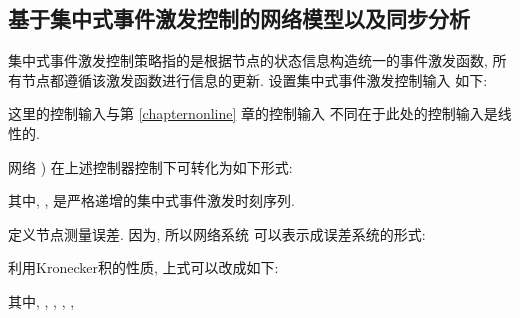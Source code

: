 \subsection{基于集中式事件激发控制的网络模型以及同步分析}\label{centralized}
        集中式事件激发控制策略指的是根据节点的状态信息构造统一的事件激发函数, 所有节点都遵循该激发函数进行信息的更新. 设置集中式事件激发控制输入 如下:
        \begin{comment}
            u_i(t_k)=-\epsilon\rho(t)d_{i}(r_{t})\Gamma[x_{i}(t_{k})-s(t_{k})]
        \end{comment}
        这里的控制输入与第 \ref{chapternonline} 章的控制输入  不同在于此处的控制输入是线性的.

        网络 ) 在上述控制器控制下可转化为如下形式:
        \begin{comment}\label{sys_cen}
        \nonumber dx_{i}(t)&=\Big[f(x_{i}(t))-\rho(t)\sum^N_{j=1}l_{ij}(r_{t})\Gamma(x_{j}(t_k)-x_{i}(t_{k}))
        +u_i(t)\Big]dt-\rho(t)R_i(t)dw_{i}(t),\\
         &\quad t_{k}\leq t< t_{k+1}, \quad i = 1,\cdots,N,
        \end{comment}
        其中, , 是严格递增的集中式事件激发时刻序列.

        定义节点测量误差. 因为, 所以网络系统  可以表示成误差系统的形式:
        \begin{comment}
            \nonumber d{e}_{i}(t)=&\Big[f(x_{i}(t))-f(s(t))-\rho(t)\sum^N_{j=1}l_{ij}(r_{t})\Gamma(\delta_j(t)+e_j(t))
            -\epsilon\rho(t)d_{i}(r_{t})\Gamma(\delta_i(t)+e_i(t)\\
                &+s(t)-s(t_k))\Big]dt-\rho(t)R_i(t)dw_{i}(t), \quad t_{k}\leq t< t_{k+1}, \quad i = 1,\cdots,N.
        \end{comment}
        利用Kronecker积的性质, 上式可以改成如下:
        \begin{comment}\label{tallerr}
         \nonumber  de(t)=&\Big[f(e(t))-\rho(t)[L(r_t)\otimes\Gamma](\delta(t)+e(t))
        -\epsilon\rho(t)[D(r_t)\otimes\Gamma](\delta(t)+e(t)+\hat{s}(t))\Big]dt\\
        &-\rho(t)\Sigma(t)dw(t),\quad t_{k}\leq t< t_{k+1}, \quad i = 1,\cdots,N.
        \end{comment}
        其中, , , , ,

